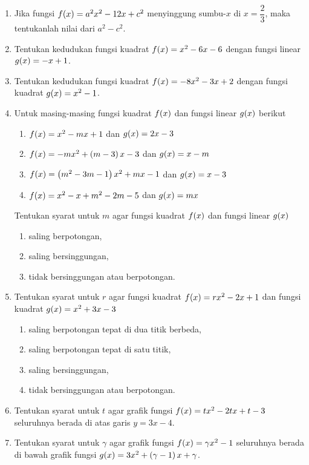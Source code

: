 \begin{enumerate}[topsep=0pt]
			\item Jika fungsi $ \mathop{}\!{f}{\left({x}\right)} = a^{2}x^{2} - 12x + c^{2} $ menyinggung sumbu-$ x $ di $ x = \dfrac{2}{3} $, maka tentukanlah nilai dari $ a^{2} - c^{2} $.
			\item Tentukan kedudukan fungsi kuadrat $ \mathop{}\!{f}{\left({x}\right)} = x^{2} - 6x - 6 $ dengan fungsi linear $ \mathop{}\!{g}{\left({x}\right)} = -x + 1 $.
			\item Tentukan kedudukan fungsi kuadrat $ \mathop{}\!{f}{\left({x}\right)} = -8x^{2} - 3x + 2 $ dengan fungsi kuadrat $ \mathop{}\!{g}{\left({x}\right)} = x^{2} - 1 $.
			\item Untuk masing-masing fungsi kuadrat $ \mathop{}\!{f}{\left({x}\right)} $ dan fungsi linear $ \mathop{}\!{g}{\left({x}\right)} $ berikut
			\begin{enumerate}[label=(\roman*)]
				\item $ \mathop{}\!{f}{\left({x}\right)} = x^{2} - mx + 1 $ dan $ \mathop{}\!{g}{\left({x}\right)} = 2x - 3 $
				\item $ \mathop{}\!{f}{\left({x}\right)} = -mx^{2} + \left(m - 3\right)x - 3 $ dan $ \mathop{}\!{g}{\left({x}\right)} = x - m $
				\item $ \mathop{}\!{f}{\left({x}\right)} = \left(m^{2} - 3m - 1\right)x^{2} + mx - 1 $ dan $ \mathop{}\!{g}{\left({x}\right)} = x - 3 $
				\item $ \mathop{}\!{f}{\left({x}\right)} = x^{2} - x + m^{2} - 2m - 5 $ dan $ \mathop{}\!{g}{\left({x}\right)} = mx $
			\end{enumerate}
			Tentukan syarat untuk $ m $ agar fungsi kuadrat $ \mathop{}\!{f}{\left({x}\right)} $ dan fungsi linear $ \mathop{}\!{g}{\left({x}\right)} $
			\begin{enumerate}
				\item saling berpotongan,
				\item saling bersinggungan,
				\item tidak bersinggungan atau berpotongan.
			\end{enumerate}
			\item Tentukan syarat untuk $ r $ agar fungsi kuadrat $ \mathop{}\!{f}{\left({x}\right)} = rx^{2} - 2x + 1 $ dan fungsi kuadrat $ \mathop{}\!{g}{\left({x}\right)} = x^{2} + 3x - 3 $
			\begin{enumerate}
				\item saling berpotongan tepat di dua titik berbeda,
				\item saling berpotongan tepat di satu titik,
				\item saling bersinggungan,
				\item tidak bersinggungan atau berpotongan.
			\end{enumerate}
			\item Tentukan syarat untuk $ t $ agar grafik fungsi $ \mathop{}\!{f}{\left({x}\right)} = tx^{2} - 2tx + t - 3 $ seluruhnya berada di atas garis $ y = 3x - 4 $.
			\item Tentukan syarat untuk $ \gamma $ agar grafik fungsi $ \mathop{}\!{f}{\left({x}\right)} = \gamma x^{2} - 1 $ seluruhnya berada di bawah grafik fungsi $ \mathop{}\!{g}{\left({x}\right)} = 3x^{2} + \left(\gamma - 1\right)x + \gamma $.

\end{enumerate}
